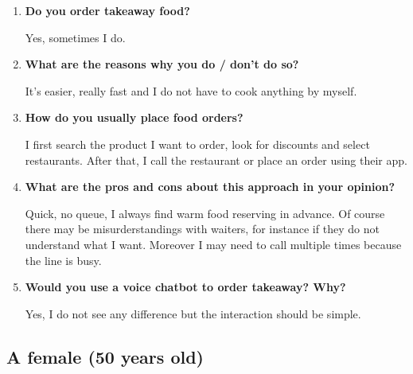 \begin{enumerate}

\item \textbf{Do you order takeaway food?}

Yes, sometimes I do.

\item \textbf{What are the reasons why you do / don't do so?}

It's easier, really fast and I do not have to cook anything by myself.

\item \textbf{How do you usually place food orders?}

I first search the product I want to order, look for discounts and select restaurants. After that, I call the restaurant or place an order using their app.

\item \textbf{What are the pros and cons about this approach in your opinion?}

Quick, no queue, I always find warm food reserving in advance. Of course there may be misurderstandings with waiters, for instance if they do not understand what I want. Moreover I may need to call multiple times because the line is busy.

\item \textbf{Would you use a voice chatbot to order takeaway? Why?}

Yes, I do not see any difference but the interaction should be simple.

\end{enumerate}


\subsection*{A female (50 years old)}

